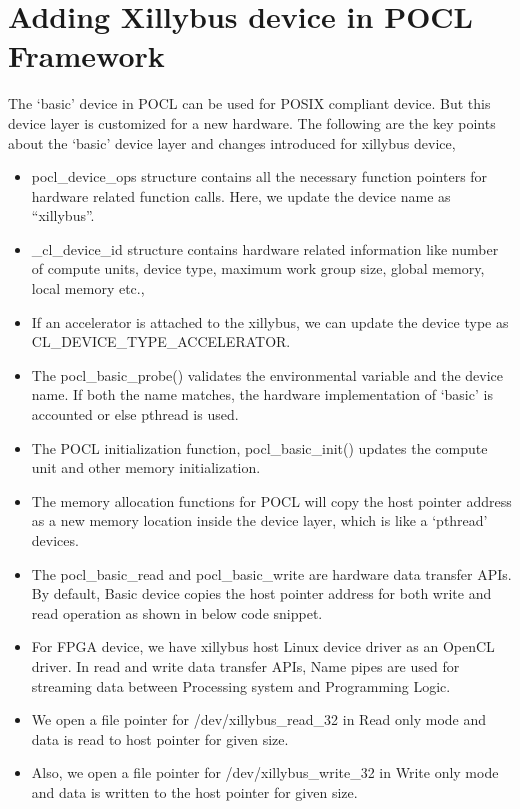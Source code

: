 \section{Adding Xillybus device in POCL Framework}
The ‘basic’ device in POCL can be used for POSIX compliant device. But this device layer is customized for a new hardware. The following are the key points about the ‘basic’ device layer and changes introduced for xillybus device,
\begin{itemize}
	\item pocl\_device\_ops structure contains all the necessary function pointers for hardware related function calls. Here, we update the device name as “xillybus”. 
	\item \_cl\_device\_id structure contains hardware related information like number of compute units, device type, maximum work group size, global memory, local memory etc.,
	\item If an accelerator is attached to the xillybus, we can update the device type as CL\_DEVICE\_TYPE\_ACCELERATOR.
	\item The pocl\_basic\_probe() validates the environmental variable and the device name. If both the name matches, the hardware implementation of ‘basic’ is accounted or else pthread is used.
	\item The POCL initialization function, pocl\_basic\_init() updates the compute unit and other memory initialization.
	\item The memory allocation functions for POCL will copy the host pointer address as a new memory location inside the device layer, which is like a ‘pthread’ devices.
	\item The pocl\_basic\_read and pocl\_basic\_write are hardware data transfer APIs. By default, Basic device copies the host pointer address for both write and read operation as shown in below code snippet.
	
	\item For FPGA device, we have xillybus host Linux device driver as an OpenCL driver. In read and write data transfer APIs, Name pipes are used for streaming data between Processing system and Programming Logic.
	\item We open a file pointer for /dev/xillybus\_read\_32 in Read only mode and data is read to host pointer for given size.
	
	\item Also, we open a file pointer for /dev/xillybus\_write\_32 in Write only mode and data is written to the host pointer for given size.
	
\end{itemize}

